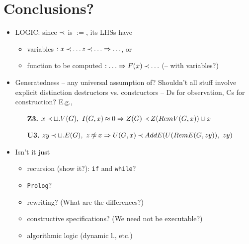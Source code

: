\documentclass[leqno]{article}
\begin{document}
\section{Conclusions?}
\begin{itemize}
\item LOGIC: since $\mathbin{\prec}$ is $:=$, its LHSs have 
 \begin{itemize}
  \item variables $:x\mathbin{\prec}\ldots z\mathbin{\prec}\ldots\mathrel\Rightarrow\ldots$, or
  \item function to be computed $:\ldots \mathrel\Rightarrow F(x)\mathbin{\prec}\ldots$ (-- with variables?)
 \end{itemize}
\item Generatedness -- any universal assumption of? Shouldn't all stuff involve explicit
distinction destructors vs. constructors -- Ds for observation, Cs for construction? 
E.g., \begin{itemize}
\item[{\bf Z3.}] $x\mathbin{\prec} \sqcup.V(G),\ I(G,x)\mathbin{\approx} 0\mathrel\Rightarrow Z(G)\mathbin{\prec} Z(RemV(G,x))\cup x$
\item[{\bf U3.}] $ zy\Incl \ch.E(G),\ z\notEq x\impl U(G,x)\Incl 
   AddE(U(RemE(G, zy)),\  zy)$
  \end{itemize}
\item Isn't it just 
 \begin{itemize}\MyLPar
 \item recursion (show it?): {\tt if} and {\tt while}?
 \item {\tt Prolog}?
 \item rewriting? (What are the differences?)
 \item constructive specifications? (We need not be executable?)
 \item algorithmic logic (dynamic l., etc.)
 \end{itemize}
\end{itemize}
\end{document}
